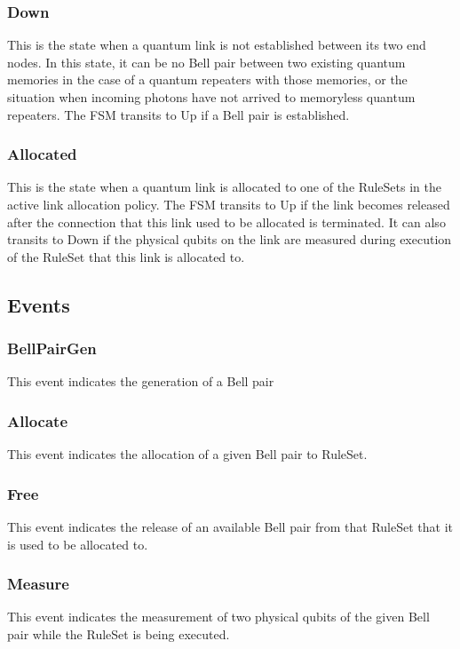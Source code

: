 \subsubsection{Down}
This is the state when a quantum link is not established between its two end nodes. In this state, it can be no Bell pair between two existing quantum memories in the case of a quantum repeaters with those memories, or the situation when incoming photons have not arrived to memoryless quantum repeaters.
The FSM transits to Up if a Bell pair is established.

\subsubsection{Allocated}
This is the state when a quantum link is allocated to one of the RuleSets in the active link allocation policy.
The FSM transits to Up if the link becomes released after the connection that this link used to be allocated is terminated.
It can also transits to Down if the physical qubits on the link are measured during execution of the RuleSet that this link is allocated to.

\subsection{Events}

\subsubsection{BellPairGen}
This event indicates the generation of a Bell pair

\subsubsection{Allocate}
This event indicates the allocation of a given Bell pair to RuleSet.

\subsubsection{Free}
This event indicates the release of an available Bell pair from that RuleSet that it is used to be allocated to.

\subsubsection{Measure}
This event indicates the measurement of two physical qubits of the given Bell pair while the RuleSet is being executed.

